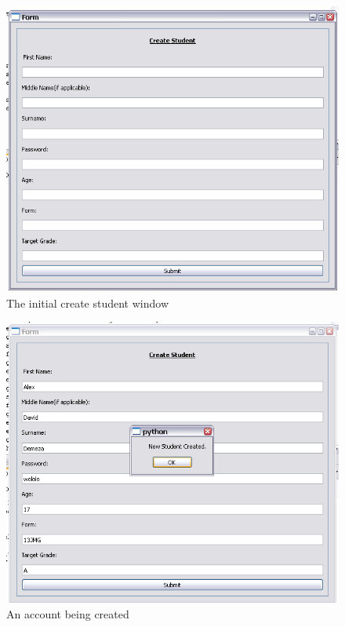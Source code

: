 \documentclass[a4paper,12pt]{report}
\begin{document}
\FloatBarrier
\begin{figure}[h!]
\centering
\includegraphics{CreateStudent}
\caption{The initial create student window}
\end{figure}
\begin{figure}[h!]
\centering
\includegraphics{CreateStudent2}
\caption{An account being created}
\end{figure}
\FloatBarrier
\end{document}

